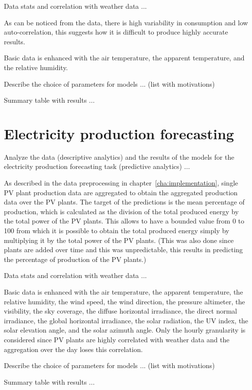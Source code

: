 Data stats and correlation with weather data ...

As can be noticed from the data, there is high variability in consumption and low auto-correlation, this suggests how it is difficult to produce highly accurate results.

Basic data is enhanced with the air temperature, the apparent temperature, and the relative humidity.

Describe the choice of parameters for models ... (list with motivations)

Summary table with results ...


\section{Electricity production forecasting}
\label{sec:productionval}
\vspace{0.2 cm}

Analyze the data (descriptive analytics) and the results of the models for the electricity production forecasting task (predictive analytics) ...

As described in the data preprocessing in chapter~\ref{cha:implementation}, single PV plant production data are aggregated to obtain the aggregated production data over the PV plants.
The target of the predictions is the mean percentage of production, which is calculated as the division of the total produced energy by the total power of the PV plants.
This allows to have a bounded value from 0 to 100 from which it is possible to obtain the total produced energy simply by multiplying it by the total power of the PV plants.
(This was also done since plants are added over time and this was unpredictable, this results in predicting the percentage of production of the PV plants.)

Data stats and correlation with weather data ...

Basic data is enhanced with the air temperature, the apparent temperature, the relative humidity, the wind speed, the wind direction, the pressure altimeter, the visibility, the sky coverage, the diffuse horizontal irradiance, the direct normal irradiance, the global horizontal irradiance, the solar radiation, the UV index, the solar elevation angle, and the solar azimuth angle.
Only the hourly granularity is considered since PV plants are highly correlated with weather data and the aggregation over the day loses this correlation.

Describe the choice of parameters for models ... (list with motivations)

Summary table with results ...
